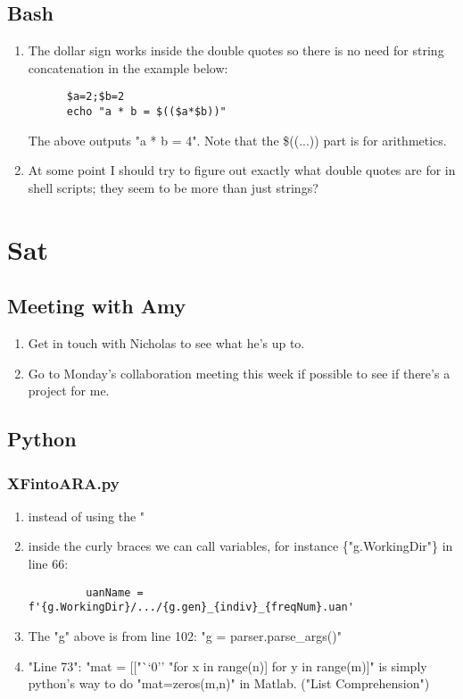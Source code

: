 \documentclass[12pt,letterpaper]{article}
\begin{document}
\subsection{Bash}
\begin{enumerate}
  \item The dollar sign works inside the double quotes so there is no need for string
    concatenation in the example below:
    \begin{verbatim}
      $a=2;$b=2
      echo "a * b = $(($a*$b))"
    \end{verbatim}
    The above outputs "a * b = 4". Note that the \$((...)) part is for arithmetics.
  \item At some point I should try to figure out exactly what double quotes are for in
    shell scripts; they seem to be more than just strings?
    
\end{enumerate}

\section{Sat}
\subsection{Meeting with Amy}
\begin{enumerate}
  \item Get in touch with Nicholas to see what he's up to.
  \item Go to Monday's collaboration meeting this week if possible to see if there's a 
    project for me.
\end{enumerate}

\subsection{Python}
\subsubsection{XFintoARA.py}
\begin{enumerate}
  \item instead of using the "%
  \item inside the curly braces we can call variables, for instance \{"g.WorkingDir"\}
    in line 66:
    \begin{verbatim}
         uanName = f'{g.WorkingDir}/.../{g.gen}_{indiv}_{freqNum}.uan'  
    \end{verbatim}
    
  \item The "g" above is from line 102: "g = parser.parse_args()"
  \item "Line 73": "mat = [["``0'' "for x in range(n)] for y in range(m)]" is simply 
    python's way to do "mat=zeros(m,n)" in Matlab. ("List Comprehension")
\end{enumerate}
\end{document}
